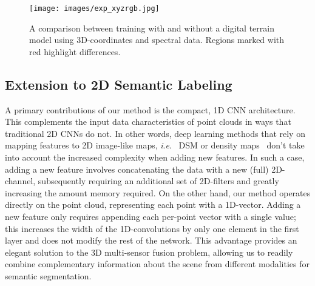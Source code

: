 \documentclass[final,3p,times,twocolumn,authoryear]{elsarticle}
\newcommand{\ie}{\textit{i}.\textit{e}.}
\begin{document}
\begin{figure*}[th]
\begin{center}
\texttt{[image: images/exp\_xyzrgb.jpg]}
\end{center}
\caption{A comparison between training with and without a digital terrain model using 3D-coordinates and spectral data. Regions marked with red highlight differences.}
\label{fig:exp_xyzrgb}
\end{figure*}

\subsection{Extension to 2D Semantic Labeling}
\label{sec:extension_to_2D}
A primary contributions of our method is the compact, 1D CNN architecture.
This complements the input data characteristics of point clouds in ways that traditional 2D CNNs do not. 
In other words, deep learning methods that rely on mapping features to 2D image-like maps, \ie~ DSM or density maps~\citep{MVCNN,Luca,Yansong} don't take into account the increased complexity when adding new features. 
In such a case, adding a new feature involves concatenating the data with a new (full) 2D-channel, subsequently requiring an additional set of 2D-filters and greatly increasing the amount memory required. 
On the other hand, our method operates directly on the point cloud, representing each point with a 1D-vector. 
Adding a new feature only requires appending each per-point vector with a single value; this increases the width of the 1D-convolutions by only one element in the first layer and does not modify the rest of the network. 
This advantage provides an elegant solution to the 3D multi-sensor fusion problem, allowing us to readily combine complementary information about the scene from different modalities for semantic segmentation. 
\end{document}
